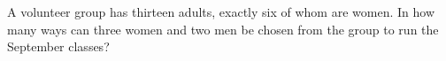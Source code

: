 A volunteer group has thirteen adults, exactly six of whom are women. In how many ways can three women and two men be chosen from the group to run the September classes?
